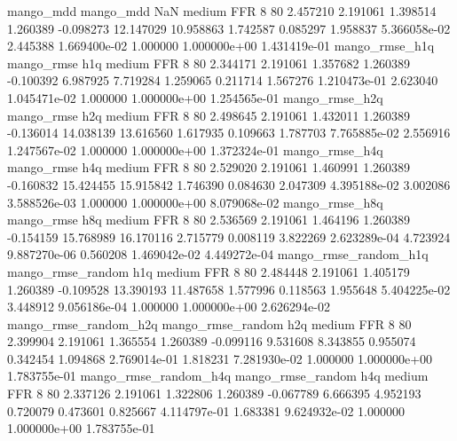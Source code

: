             mango_mdd         mango_mdd                  NaN     medium      FFR                 8 80  2.457210       2.191061 1.398514       1.260389   -0.098273     12.147029     10.958863     1.742587       0.085297  1.958837 5.366058e-02     2.445388   1.669400e-02            1.000000    1.000000e+00        1.431419e-01
       mango_rmse_h1q        mango_rmse                  h1q     medium      FFR                 8 80  2.344171       2.191061 1.357682       1.260389   -0.100392      6.987925      7.719284     1.259065       0.211714  1.567276 1.210473e-01     2.623040   1.045471e-02            1.000000    1.000000e+00        1.254565e-01
       mango_rmse_h2q        mango_rmse                  h2q     medium      FFR                 8 80  2.498645       2.191061 1.432011       1.260389   -0.136014     14.038139     13.616560     1.617935       0.109663  1.787703 7.765885e-02     2.556916   1.247567e-02            1.000000    1.000000e+00        1.372324e-01
       mango_rmse_h4q        mango_rmse                  h4q     medium      FFR                 8 80  2.529020       2.191061 1.460991       1.260389   -0.160832     15.424455     15.915842     1.746390       0.084630  2.047309 4.395188e-02     3.002086   3.588526e-03            1.000000    1.000000e+00        8.079068e-02
       mango_rmse_h8q        mango_rmse                  h8q     medium      FFR                 8 80  2.536569       2.191061 1.464196       1.260389   -0.154159     15.768989     16.170116     2.715779       0.008119  3.822269 2.623289e-04     4.723924   9.887270e-06            0.560208    1.469042e-02        4.449272e-04
mango_rmse_random_h1q mango_rmse_random                  h1q     medium      FFR                 8 80  2.484448       2.191061 1.405179       1.260389   -0.109528     13.390193     11.487658     1.577996       0.118563  1.955648 5.404225e-02     3.448912   9.056186e-04            1.000000    1.000000e+00        2.626294e-02
mango_rmse_random_h2q mango_rmse_random                  h2q     medium      FFR                 8 80  2.399904       2.191061 1.365554       1.260389   -0.099116      9.531608      8.343855     0.955074       0.342454  1.094868 2.769014e-01     1.818231   7.281930e-02            1.000000    1.000000e+00        1.783755e-01
mango_rmse_random_h4q mango_rmse_random                  h4q     medium      FFR                 8 80  2.337126       2.191061 1.322806       1.260389   -0.067789      6.666395      4.952193     0.720079       0.473601  0.825667 4.114797e-01     1.683381   9.624932e-02            1.000000    1.000000e+00        1.783755e-01
